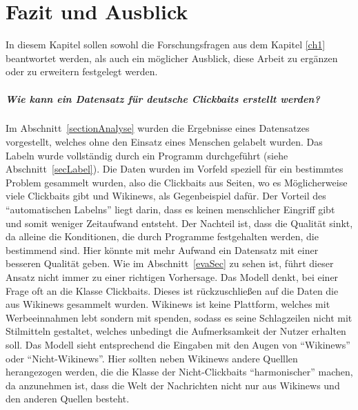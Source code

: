 \chapter{Fazit und Ausblick}
In diesem Kapitel sollen sowohl die Forschungsfragen aus dem Kapitel \ref{ch1} beantwortet werden, als auch ein möglicher Ausblick, diese Arbeit zu ergänzen oder zu erweitern festgelegt werden.

 

\paragraph{Wie kann ein Datensatz für deutsche Clickbaits erstellt werden?}
Im Abschnitt~\ref{sectionAnalyse} wurden die Ergebnisse eines Datensatzes vorgestellt, welches ohne den Einsatz eines Menschen gelabelt wurden. Das Labeln wurde vollständig durch ein Programm durchgeführt (siehe Abschnitt~\ref{secLabel}). Die Daten wurden im Vorfeld speziell für ein bestimmtes Problem gesammelt wurden, also die Clickbaits aus Seiten, wo es Möglicherweise viele Clickbaits gibt  und Wikinews, als Gegenbeispiel dafür. Der Vorteil des \enquote{automatischen Labelns} liegt darin, dass es keinen menschlicher Eingriff gibt und somit weniger Zeitaufwand entsteht. Der Nachteil ist, dass die Qualität sinkt, da alleine die Konditionen, die durch Programme festgehalten werden, die bestimmend sind. Hier könnte mit mehr Aufwand ein Datensatz mit einer besseren Qualität geben. Wie im Abschnitt~\ref{evaSec} zu sehen ist, führt dieser Ansatz nicht immer zu einer richtigen Vorhersage. Das Modell denkt, bei einer Frage oft an die Klasse Clickbaits. Dieses ist rückzuschließen auf die Daten die aus Wikinews gesammelt wurden. Wikinews ist keine Plattform, welches mit Werbeeinnahmen lebt sondern mit spenden, sodass es seine Schlagzeilen nicht mit Stilmitteln gestaltet, welches unbedingt die Aufmerksamkeit der Nutzer erhalten soll. Das Modell sieht entsprechend die Eingaben mit den Augen von \enquote{Wikinews} oder \enquote{Nicht-Wikinews}. Hier sollten neben Wikinews andere Quelllen herangezogen werden, die die Klasse der Nicht-Clickbaits \enquote{harmonischer} machen, da anzunehmen ist, dass die Welt der Nachrichten nicht nur aus Wikinews und den anderen Quellen besteht.


